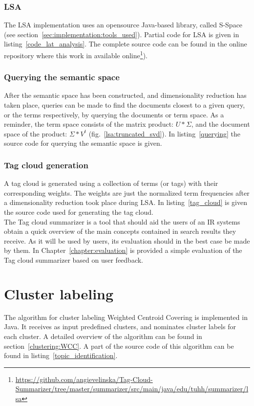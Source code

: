 \subsubsection{LSA}
The LSA implementation uses an opensource Java-based library, called S-Space (see section~\ref{sec:implementation:tools_used}). Partial code for \gls{LSA} is given in listing~\ref{code_lat_analysis}. The complete source code can be found in the online repository where this work in available online\footnote{\url{https://github.com/angievelinska/Tag-Cloud-Summarizer/tree/master/summarizer/src/main/java/edu/tuhh/summarizer/lsa}}).

\subsubsection{Querying the semantic space}
After the semantic space has been constructed, and dimensionality reduction has taken place, queries can be made to find the documents closest to a given query, or the terms respectively, by querying the documents or term space. As a reminder, the term space consists of the matrix product: $U * \Sigma$, and the document space of the product: $\Sigma * V^{t} $ (fig.~\ref{lsa:truncated_svd}). 
In listing~\ref{querying} the source code for querying the semantic space is given.

\subsubsection{Tag cloud generation}
A tag cloud is generated using a collection of terms (or tags) with their corresponding weights. The weights are just the normalized term frequencies after a dimensionality reduction took place during \gls{LSA}. In listing~\ref{tag_cloud} is given the source code used for generating the tag cloud. \\

The Tag cloud summarizer is a tool that should aid the users of an \gls{IR} systems obtain a quick overview of the main concepts contained in search results they receive. As it will be used by users, its evaluation should in the best case be made by them. In Chapter~\ref{chapter:evaluation} is provided a simple evaluation of the Tag cloud summarizer based on user feedback. 

\section{Cluster labeling}
The algorithm for cluster labeling Weighted Centroid Covering is implemented in Java. It receives as input predefined clusters, and nominates cluster labels for each cluster. A detailed overview of the algorithm can be found in section~\ref{clustering:WCC}. A part of the source code  of this algorithm can be found in listing~\ref{topic_identification}.

